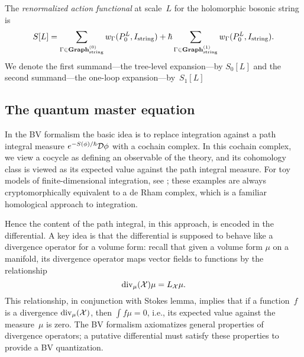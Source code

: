 
\begin{dfn}
The {\em renormalized action functional} at scale~$L$ for the holomorphic bosonic string is
\[
S[L] = \sum_{\Gamma \in {\bf Graph}_{\rm string}^{(0)}} w_{\Gamma}(P_{0}^L,I_{\rm string}) + \hbar\sum_{\Gamma \in {\bf Graph}_{\rm string}^{(1)}} w_{\Gamma}(P_{0}^L,I_{\rm string}).
\]
We denote the first summand---the tree-level expansion---by $S_0[L]$ 
and the second summand---the one-loop expansion---by~$S_1[L]$
\end{dfn}



\subsection{The quantum master equation}
\label{subsec: QME}

In the BV formalism the basic idea is to replace integration against a path integral measure $e^{-S(\phi)/\hbar} \mathcal D \phi$ with a cochain complex.
In this cochain complex, we view a cocycle as defining an observable of the theory,
and its cohomology class is viewed as its expected value against the path integral measure.
For toy models of finite-dimensional integration, see \cite{};
these examples are always cryptomorphically equivalent to a de Rham complex,
which is a familiar homological approach to integration.

Hence the content of the path integral, in this approach, is encoded in the differential. 
A key idea is that the differential is supposed to behave like a divergence operator for a volume form:
recall that given a volume form $\mu$ on a manifold, 
its divergence operator maps vector fields to functions by the relationship
\[
{\rm div}_\mu({\mathcal X}) \mu = L_{\mathcal X} \mu.
\] 
This relationship, in conjunction with Stokes lemma, 
implies that if a function~$f$ is a divergence ${\rm div}_\mu({\mathcal X})$,
then $\int f \mu = 0$,
i.e., its expected value against the measure~$\mu$ is zero.
The BV formalism axiomatizes general properties of divergence operators;
a putative differential must satisfy these properties to provide a BV quantization.


